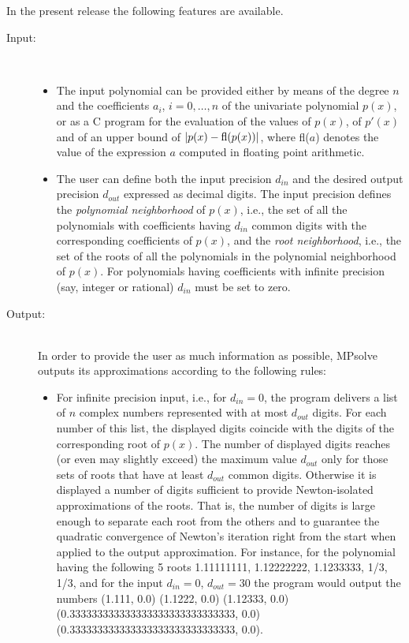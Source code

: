\documentclass{article}
\begin{document}
In the present release the following features are available.

\begin{description}
\item[Input:] \ \\

  \begin{itemize}
  \item The input polynomial can be provided either by means of the
    degree $n$ and the coefficients $a_i$, $i=0,\ldots, n$ of the
    univariate polynomial $p(x)$, or as a C program for the evaluation
    of the values of $p(x)$, of $p'(x)$ and of an upper bound of
    $|p(x)-{\rm fl}(p(x))|$, where fl($a$) denotes the value of the
    expression $a$ computed in floating point arithmetic.
   
 \item The user can define both the input precision $d_{in}$ and the
   desired output precision $d_{out}$ expressed as decimal digits.
   The input precision defines the {\it polynomial neighborhood} of
   $p(x)$, i.e., the set of all the polynomials with coefficients
   having $d_{in}$ common digits with the corresponding coefficients
   of $p(x)$, and the {\it root neighborhood}, i.e., the set of the
   roots of all the polynomials in the polynomial neighborhood of
   $p(x)$.  For polynomials having coefficients with infinite
   precision (say, integer or rational) $d_{in}$ must be set to zero.
  \end{itemize}

\item[Output:] \ \\
   In order to provide the user as much information as possible, MPsolve
   outputs its approximations according to the following rules:
   \begin{itemize}
   \item For infinite precision input, i.e., for $d_{in}=0$, the
     program delivers a list of $n$ complex numbers represented with
     at most $d_{out}$ digits.  For each number of this list, the
     displayed digits coincide with the digits of the corresponding
     root of $p(x)$. The number of displayed digits reaches (or even
     may slightly exceed) the maximum value $d_{out}$ only for those
     sets of roots that have at least $d_{out}$ common digits.
     Otherwise it is displayed a number of digits sufficient to
     provide Newton-isolated approximations of the roots.  That is, the
     number of digits is large enough to separate each root from the
     others and to guarantee the quadratic convergence of Newton's
     iteration right from the start when applied to the output
     approximation. For instance, for the polynomial having the
     following 5 roots 1.11111111, 1.12222222, 1.1233333, 1/3, 1/3,
     and for the input $d_{in}=0$, $d_{out}=30$ the program would
     output the numbers (1.111, 0.0) (1.1222, 0.0) (1.12333, 0.0)
     (0.333333333333333333333333333333, 0.0) \\
     (0.333333333333333333333333333333, 0.0).


\end{itemize}
\end{description}
\end{document}
